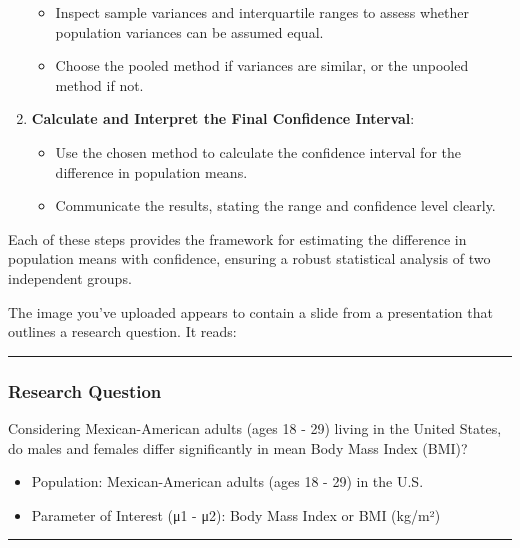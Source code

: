 \documentclass[
  letterpaper,
  DIV=11,
  numbers=noendperiod]{scrartcl}
\providecommand{\tightlist}{%
  \setlength{\itemsep}{0pt}\setlength{\parskip}{0pt}}\usepackage{longtable,booktabs,array}
\begin{document}
\begin{enumerate}
  \begin{itemize}
  \tightlist
  \item
    Inspect sample variances and interquartile ranges to assess whether
    population variances can be assumed equal.
  \item
    Choose the pooled method if variances are similar, or the unpooled
    method if not.
  \end{itemize}
\item
  \textbf{Calculate and Interpret the Final Confidence Interval}:

  \begin{itemize}
  \tightlist
  \item
    Use the chosen method to calculate the confidence interval for the
    difference in population means.
  \item
    Communicate the results, stating the range and confidence level
    clearly.
  \end{itemize}
\end{enumerate}

Each of these steps provides the framework for estimating the difference
in population means with confidence, ensuring a robust statistical
analysis of two independent groups.

The image you've uploaded appears to contain a slide from a presentation
that outlines a research question. It reads:

\begin{center}\rule{0.5\linewidth}{0.5pt}\end{center}

\hypertarget{research-question}{%
\subsubsection{Research Question}\label{research-question}}

Considering Mexican-American adults (ages 18 - 29) living in the United
States, do males and females differ significantly in mean Body Mass
Index (BMI)?

\begin{itemize}
\tightlist
\item
  Population: Mexican-American adults (ages 18 - 29) in the U.S.
\item
  Parameter of Interest (μ1 - μ2): Body Mass Index or BMI (kg/m²)
\end{itemize}

\begin{center}\rule{0.5\linewidth}{0.5pt}\end{center}
\end{document}
